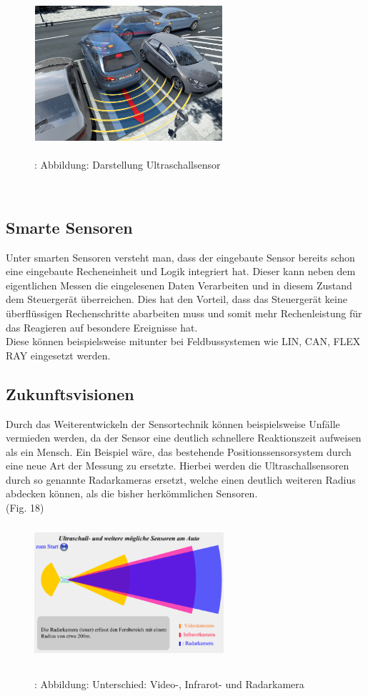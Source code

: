 					\begin{figure}
						\includegraphics[width=7cm, height=5cm] {ultraschall.png}
						\caption {\\\cite{TS33}: Abbildung: Darstellung Ultraschallsensor}
					\end{figure}\\
					
				
				
		\subsection{Smarte Sensoren} 
			Unter smarten Sensoren versteht man, dass der eingebaute Sensor bereits schon eine eingebaute Recheneinheit und Logik integriert hat. Dieser kann neben dem eigentlichen Messen die eingelesenen Daten Verarbeiten und in diesem Zustand dem Steuergerät überreichen. Dies hat den Vorteil, dass das Steuergerät keine überflüssigen Rechenschritte abarbeiten muss und somit mehr Rechenleistung für das Reagieren auf besondere Ereignisse hat.\\
			Diese können beispielsweise mitunter bei Feldbussystemen wie LIN, CAN, FLEX RAY eingesetzt werden.		
		
		
		
		\subsection{Zukunftsvisionen} 
 			Durch das Weiterentwickeln der Sensortechnik können beispielsweise Unfälle vermieden werden, da der Sensor eine deutlich schnellere Reaktionszeit aufweisen als ein Mensch. Ein Beispiel wäre, das bestehende Positionssensorsystem durch eine neue Art der Messung zu ersetzte. Hierbei werden die Ultraschallsensoren durch so genannte Radarkameras ersetzt, welche einen deutlich weiteren Radius abdecken können, als die bisher herkömmlichen Sensoren.\\(Fig. 18)
 			
 			\begin{figure}
 				\includegraphics[width=7cm, height=5cm] {radarsensor.png}
 				\caption {\\\cite{TS34}: Abbildung: Unterschied: Video-, Infrarot- und Radarkamera}
 			\end{figure}

